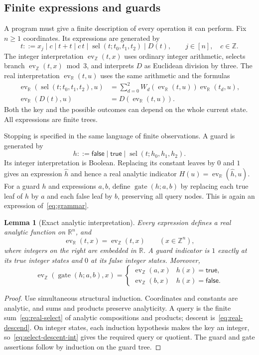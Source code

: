 \documentclass[11pt]{article}
\numberwithin{equation}{section}
\newtheorem{lemma}[theorem]{Lemma}
\theoremstyle{definition}
\theoremstyle{remark}
\newcommand{\Z}{\mathbb Z}
\newcommand{\R}{\mathbb R}
\newcommand{\ev}{\operatorname{ev}}
\newcommand{\Sel}{\operatorname{sel}}
\newcommand{\Gate}{\operatorname{gate}}
\begin{document}
\subsection{Finite expressions and guards}

A program must give a finite description of every operation it can
perform. Fix $n\geq1$ coordinates. Its expressions are generated by
\begin{equation}\label{eq:grammar}
 t ::= x_j\mid c\mid t+t\mid c\,t
       \mid\Sel(t;t_0,t_1,t_2)\mid D(t),
 \qquad j\in[n],\quad c\in\Z.
\end{equation}
The integer interpretation $\ev_\Z(t,x)$ uses ordinary integer
arithmetic, selects branch $\ev_\Z(t,x)\bmod3$, and interprets $D$
as Euclidean division by three. The real interpretation
$\ev_\R(t,u)$ uses the same arithmetic and the formulas
\begin{align}
 \ev_\R(\Sel(t;t_0,t_1,t_2),u)
   &=\sum_{d=0}^2W_d(\ev_\R(t,u))\ev_\R(t_d,u),\label{eq:real-select}\\
 \ev_\R(D(t),u)&=D(\ev_\R(t,u)).\label{eq:real-descend}
\end{align}
Both the key and the possible outcomes can depend on the whole current
state. All expressions are finite trees.

Stopping is specified in the same language of finite observations. A
guard is generated by
\[
 h ::= \mathsf{false}\mid\mathsf{true}
       \mid\Sel(t;h_0,h_1,h_2).
\]
Its integer interpretation is Boolean. Replacing its constant leaves by
$0$ and $1$ gives an expression $\widehat h$ and hence a real analytic
indicator $H(u)=\ev_\R(\widehat h,u)$. For a guard $h$ and expressions
$a,b$, define $\Gate(h;a,b)$ by replacing each true leaf of $h$ by
$a$ and each false leaf by $b$, preserving all query nodes. This is
again an expression of~\eqref{eq:grammar}.

\begin{lemma}[Exact analytic interpretation]\label{lem:interpretation}
Every expression defines a real analytic function on $\R^n$, and
\[
 \ev_\R(t,x)=\ev_\Z(t,x)\qquad(x\in\Z^n),
\]
where integers on the right are embedded in $\R$. A guard indicator
is $1$ exactly at its true integer states and $0$ at its false integer
states. Moreover,
\[
 \ev_\Z(\Gate(h;a,b),x)=
 \begin{cases}\ev_\Z(a,x)&h(x)=\mathsf{true},\\
               \ev_\Z(b,x)&h(x)=\mathsf{false}.
 \end{cases}
\]
\end{lemma}
\begin{proof}
Use simultaneous structural induction. Coordinates and constants are
analytic, and sums and products preserve analyticity. A query is the
finite sum~\eqref{eq:real-select} of analytic compositions and products;
descent is~\eqref{eq:real-descend}. On integer states, each induction
hypothesis makes the key an integer, so~\eqref{eq:select-descent-int}
gives the required query or quotient. The guard and gate assertions
follow by induction on the guard tree.
\end{proof}
\end{document}
